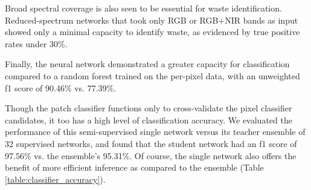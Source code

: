 \documentclass[10pt,letterpaper]{article}
\begin{document}
Broad spectral coverage is also seen to be essential for waste identification. Reduced-spectrum networks that took only RGB or RGB+NIR bands as input showed only a minimal capacity to identify waste, as evidenced by true positive rates under 30\%.

Finally, the neural network demonstrated a greater capacity for classification compared to a random forest trained on the per-pixel data, with an unweighted f1 score of 90.46\% vs.  77.39\%.

Though the patch classifier functions only to cross-validate the pixel classifier candidates, it too has a high level of classification accuracy. We evaluated the performance of this semi-supervised single network versus its teacher ensemble of 32 supervised networks, and found that the student network had an f1 score of 97.56\% vs. the ensemble's 95.31\%. Of course, the single network also offers the benefit of more efficient inference as compared to the ensemble (Table \ref{table:classifier_accuracy}).
\end{document}
